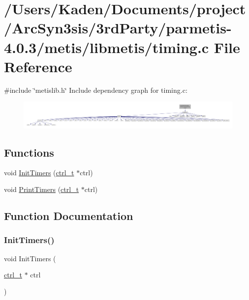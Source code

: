 \hypertarget{a00290}{}\section{/\+Users/\+Kaden/\+Documents/project/\+Arc\+Syn3sis/3rd\+Party/parmetis-\/4.0.3/metis/libmetis/timing.c File Reference}
\label{a00290}
{\ttfamily \#include \char`\"{}metislib.\+h\char`\"{}}\newline
Include dependency graph for timing.\+c\+:\nopagebreak
\begin{figure}[H]
\begin{center}
\leavevmode
\includegraphics[width=350pt]{a00291}
\end{center}
\end{figure}
\subsection*{Functions}
\begin{DoxyCompactItemize}
\item 
void \hyperlink{a00290_a09eb39c46e7048dd595e0350f2077ed8}{Init\+Timers} (\hyperlink{a00742}{ctrl\+\_\+t} $\ast$ctrl)
\item 
void \hyperlink{a00290_a51a5f1034f9536397e3d13fea6c17637}{Print\+Timers} (\hyperlink{a00742}{ctrl\+\_\+t} $\ast$ctrl)
\end{DoxyCompactItemize}


\subsection{Function Documentation}
\mbox{\label{a00290_a09eb39c46e7048dd595e0350f2077ed8}} 
\subsubsection{\texorpdfstring{Init\+Timers()}{InitTimers()}}
{\footnotesize\ttfamily void Init\+Timers (\begin{DoxyParamCaption}\item[{\hyperlink{a00742}{ctrl\+\_\+t} $\ast$}]{ctrl }\end{DoxyParamCaption})}

